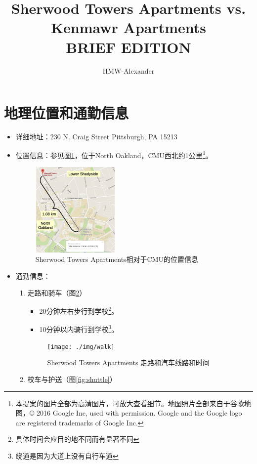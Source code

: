 \documentclass[nofonts,a4paper,11pt]{article}
\title{\textbf{Sherwood Towers Apartments vs. Kenmawr Apartments}\\BRIEF EDITION}
\author{HMW-Alexander}
\begin{document}
\maketitle

\section{地理位置和通勤信息}

\begin{itemize}
	\item 详细地址：230 N. Craig Street Pittsburgh, PA 15213
	\item 位置信息：参见图\ref{fig:cmu-kenmawr}，位于North Oakland，CMU西北约1公里\footnote{本提案的图片全部为高清图片，可放大查看细节。地图照片全部来自于谷歌地图，© 2016 Google Inc, used with permission. Google and the Google logo are registered trademarks of Google Inc.}。
	\begin{figure}[!htb]
	\centering
	\includegraphics[width=0.4\textwidth]{./img/sherwood}
	\caption{Sherwood Towers Apartments相对于CMU的位置信息}
	\label{fig:cmu-kenmawr}
	\end{figure}
	\item 通勤信息：
	\begin{enumerate}
		\item 走路和骑车（图\ref{fig:walk}）
		\begin{itemize}
			\item 20分钟左右步行到学校\footnote{具体时间会应目的地不同而有显著不同}。
			\item 10分钟以内骑行到学校\footnote{绕道是因为大道上没有自行车道}。
		\end{itemize}
		\begin{figure}[!h]
			\centering
			\texttt{[image: ./img/walk]}
			\caption{Sherwood Towers Apartments 走路和汽车线路和时间}
			\label{fig:walk}
		\end{figure}
		\item 校车与护送（图\ref{fig:shuttle}）

\end{enumerate}
\end{itemize}
\end{document}
